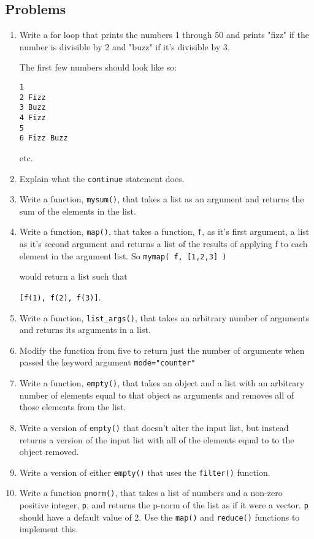 \subsection{Problems}
\begin{enumerate}
	\item Write a for loop that prints the numbers 1 through 50 and prints "fizz" if the number is divisible by 2 and "buzz" if it's divisible by 3.

The first few numbers should look like so:
\begin{verbatim}
1
2 Fizz
3 Buzz
4 Fizz
5
6 Fizz Buzz
\end{verbatim}
etc.

	\item Explain what the \verb|continue| statement does.
	\item Write a function, \verb|mysum()|, that takes a list as an argument and returns the sum of the elements in the list.
	\item Write a function, \verb|map()|, that takes a function, \verb|f|, as it's first argument, a list as it's second argument and returns a list of the results of applying f to each element in the argument list. So \verb|mymap( f, [1,2,3] )|

would return a list such that

\verb|[f(1), f(2), f(3)]|.

	\item Write a function, \verb|list_args()|, that takes an arbitrary number of arguments and returns its arguments in a list.
	\item Modify the function from five to return just the number of arguments when passed the keyword argument
\verb|mode="counter"|

	\item Write a function, \verb|empty()|, that takes an object and a list with an arbitrary number of elements equal to that object as arguments and removes all of those elements from the list.

	\item Write a version of \verb|empty()| that doesn't alter the input list, but instead returns a version of the input list with all of the elements equal to to the object removed.

	\item Write a version of either \verb|empty()| that uses the \verb|filter()| function.

	\item Write a function \verb|pnorm()|, that takes a list of numbers and a non-zero positive integer, \verb|p|, and returns the p-norm of the list as if it were a vector. \verb|p| should have a default value of 2. Use the \verb|map()| and \verb|reduce()| functions to implement this.


\end{enumerate}
